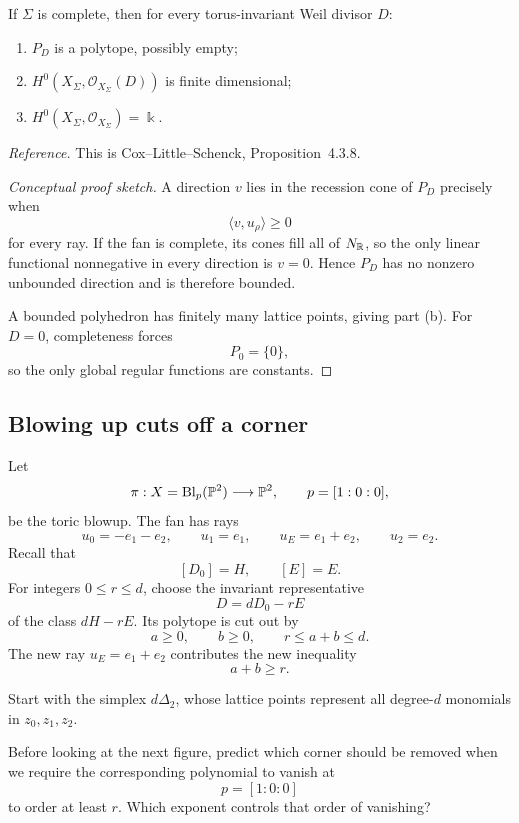 \begin{proposition}
\label{prop:complete-fan-bounded-PD}
If \(\Sigma\) is complete, then for every torus-invariant Weil divisor
\(D\):
\begin{enumerate}[label=(\alph*),wide=0pt]
\item \(P_D\) is a polytope, possibly empty;
\item \(H^0(X_\Sigma,\mathcal O_{X_\Sigma}(D))\) is finite
dimensional;
\item \(H^0(X_\Sigma,\mathcal O_{X_\Sigma})=\Bbbk\).
\end{enumerate}
\end{proposition}

\noindent
\textit{Reference.}
This is Cox--Little--Schenck, Proposition~4.3.8.

\begin{proof}[Conceptual proof sketch]
A direction \(v\) lies in the recession cone of \(P_D\) precisely when
\[
\langle v,u_\rho\rangle\geq0
\]
for every ray. If the fan is complete, its cones fill all of
\(N_\RR\), so the only linear functional nonnegative in every
direction is \(v=0\). Hence \(P_D\) has no nonzero unbounded
direction and is therefore bounded.

A bounded polyhedron has finitely many lattice points, giving part
\textup{(b)}. For \(D=0\), completeness forces
\[
P_0=\{0\},
\]
so the only global regular functions are constants.
\end{proof}

\subsection{Blowing up cuts off a corner}

Let
\[
\pi:X=\Blp{\PP^2}{p}\longrightarrow\PP^2,
\qquad
p=[1:0:0],
\]
be the toric blowup. The fan has rays
\[
u_0=-e_1-e_2,
\qquad
u_1=e_1,
\qquad
u_E=e_1+e_2,
\qquad
u_2=e_2.
\]
Recall that
\[
[D_0]=H,
\qquad
[E]=E.
\]
For integers \(0\leq r\leq d\), choose the invariant representative
\[
D=dD_0-rE
\]
of the class \(dH-rE\). Its polytope is cut out by
\[
a\geq0,
\qquad
b\geq0,
\qquad
r\leq a+b\leq d.
\]
The new ray \(u_E=e_1+e_2\) contributes the new inequality
\[
a+b\geq r.
\]

\begin{prediction}
Start with the simplex \(d\Delta_2\), whose lattice points represent
all degree-\(d\) monomials in \(z_0,z_1,z_2\).

Before looking at the next figure, predict which corner should be
removed when we require the corresponding polynomial to vanish at
\[
p=[1:0:0]
\]
to order at least \(r\). Which exponent controls that order of
vanishing?
\end{prediction}

